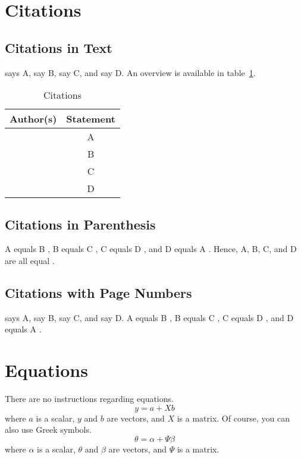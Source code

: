 \documentclass{apecon}
\begin{document}
\section{Citations}
\subsection{Citations in Text}
\citet{smith72} says A, \citet{brown05} say B,
\citet{smith72a} say C, and \citet{smith72b} say D.
An overview is available in table~\ref{tab:citations}.

\begin{table}[htbp]
\caption{Citations}
\label{tab:citations}
\begin{tabular}{lc}
\hline
Author(s) & Statement\\
\hline
\citet{smith72} & A\\
\citet{brown05} & B\\
\citet{smith72a} & C\\
\citet{smith72b} & D\\
\hline
\end{tabular}
\end{table}


\subsection{Citations in Parenthesis}
A equals B \citep{smith72}, B equals C \citep{brown05},
C equals D \citep{smith72a}, and D equals A \citep{smith72b}.
Hence, A, B, C, and D are all equal
\citep{smith72, brown05, smith72a, smith72b}.

\subsection{Citations with Page Numbers}
\citet[p.~123]{smith72} says A, \citet[p.~234]{brown05} say B,
\citet[p.~345]{smith72a} say C, and \citet[p.~456]{smith72b} say D.
A equals B \citep[p.~123]{smith72}, B equals C \citep[p.~234]{brown05},
C equals D \citep[p.~345]{smith72a}, and D equals A \citep[p.~456]{smith72b}.


\section{Equations}
There are no instructions regarding equations.
\begin{equation}
y = a + X b
\end{equation}
where $a$ is a scalar,
$y$ and $b$ are vectors,
and $X$ is a matrix.
Of course, you can also use Greek symbols.
\begin{equation}
\theta = \alpha + \Psi \beta
\end{equation}
where $\alpha$ is a scalar,
$\theta$ and $\beta$ are vectors,
and $\Psi$ is a matrix.

\clearpage
\nocite{*}


\end{document}

